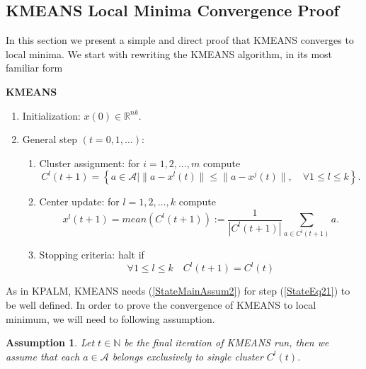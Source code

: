 \documentclass[12pt]{article}
\numberwithin{equation}{section}
\newtheorem{assumption}{Assumption}
\begin{document}
\subsection{KMEANS Local Minima Convergence Proof}

In this section we present a simple and direct proof that KMEANS converges to local minima. We start with rewriting the KMEANS algorithm, in its most familiar form
\begin{framed}
\noindent \textbf{KMEANS}
\begin{enumerate}[(1)]
	\item Initialization: $x(0) \in \mathbb{R}^{nk}$.
	\item General step $\left( t=0,1, \ldots \right)$:
	\begin{enumerate}[(2.1)]
		\item Cluster assignment: for $i=1, 2, \ldots ,m$ compute
		\begin{equation}
			C^l(t+1) = \left\lbrace a \in \mathcal{A} \mid \| a - x^l(t) \| \leq \|a - x^j(t) \|, \quad \forall 1 \leq l \leq k \right\rbrace . \label{StateEq20}
		\end{equation}
		\item Center update: for $l=1, 2, \ldots ,k$ compute
		\begin{equation}
			x^l(t+1) = mean(C^l(t+1)) := \frac{1}{\left| C^l(t+1) \right|} \sum\limits_{a \in C^l(t+1)} a . \label{StateEq21}
		\end{equation}
		\item Stopping criteria: halt if 
		\begin{equation}
			\forall 1 \leq l \leq k \quad C^l(t+1)=C^l(t) \label{StateEq22}
		\end{equation}
	\end{enumerate}
\end{enumerate}
\end{framed}

As in KPALM, KMEANS needs (\ref{StateMainAssum2}) for step (\ref{StateEq21}) to be well defined. In order to prove the convergence of KMEANS to local minimum, we will need to following assumption.

\begin{assumption} \label{StateEq23}
Let $t \in \mathbb{N}$ be the final iteration of KMEANS run, then we assume that each $a \in \mathcal{A}$ belongs exclusively to single cluster $C^l(t)$.
\end{assumption}
\end{document}
